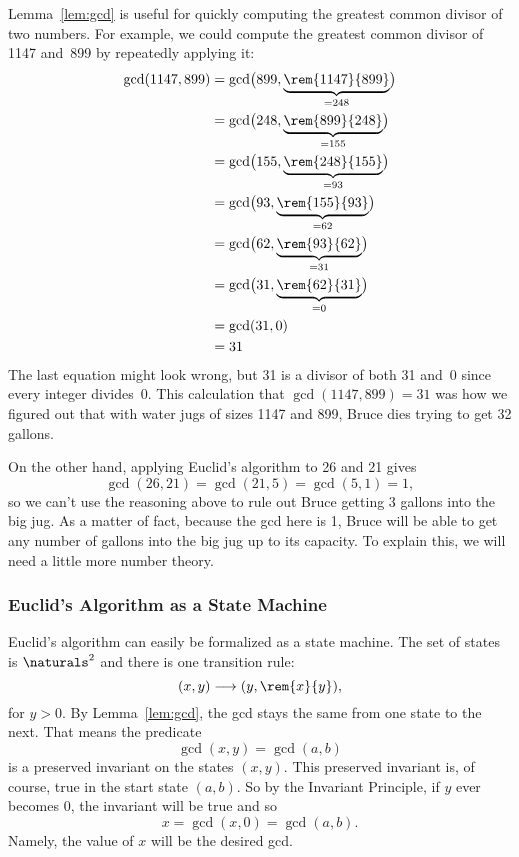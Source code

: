 Lemma~\ref{lem:gcd} is useful for quickly computing the greatest common divisor of two
numbers.  For example, we could compute the greatest common divisor of 1147 and~899 by
repeatedly applying it:
\begin{align*}
\gcd(1147, 899) &= \gcd\bigl(899, \underbrace{\rem{1147}{899}}_{{} = 248}\bigr) \\ &=
\gcd\bigl(248, \underbrace{\rem{899}{248}}_{{} = 155}\bigr) \\ &= \gcd\bigl(155,
\underbrace{\rem{248}{155}}_{{} = 93}\bigr) \\ &= \gcd\bigl(93,
\underbrace{\rem{155}{93}}_{{} = 62}\bigr) \\ &= \gcd\bigl(62,
\underbrace{\rem{93}{62}}_{{} = 31}\bigr) \\ &= \gcd\bigl(31, \underbrace{\rem{62}{31}}_{{}
  = 0}\bigr) \\ &= \gcd(31, 0) \\ &= 31
\end{align*}
The last equation might look wrong, but 31 is a divisor of both 31 and~0 since every
integer divides~0.  This calculation that $\gcd(1147, 899) = 31$ was how we figured out
that with water jugs of sizes 1147 and 899, Bruce dies trying to get 32 gallons.

On the other hand, applying Euclid's algorithm to 26 and 21 gives
\[
\gcd(26, 21) = \gcd(21, 5) = \gcd(5, 1) = 1,
\]
so we can't use the reasoning above to rule out Bruce getting 3 gallons into the big jug.
As a matter of fact, because the gcd here is 1, Bruce will be able to get any number of
gallons into the big jug up to its capacity.  To explain this, we will need a little more
number theory.

\subsubsection{Euclid's Algorithm as a State Machine}
Euclid's algorithm can easily be formalized as a state machine.  The set of states is
$\naturals^2$ and there is one transition rule:
\begin{equation}\label{euclid_transition}
(x,y) \movesto (y, \rem{x}{y}),
\end{equation}
for $y>0$.  By Lemma~\ref{lem:gcd}, the gcd stays the same from one state to the next.
That means the predicate
\[
\gcd(x,y) = \gcd(a,b)
\]
is a preserved invariant on the states $(x,y)$.  This preserved invariant is, of course,
true in the start state $(a,b)$.  So by the Invariant Principle, if $y$ ever becomes $0$,
the invariant will be true and so
\[
x = \gcd(x,0) = \gcd(a,b).
\]
Namely, the value of $x$ will be the desired gcd.

